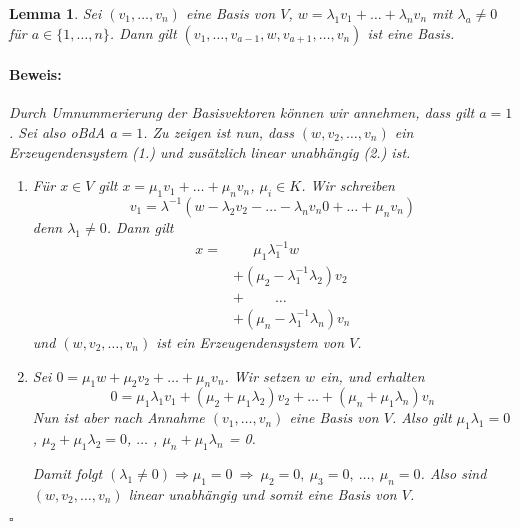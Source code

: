 \documentclass{report}
\newcommand{\lb}{\lambda}
\theoremstyle{customrem}
\theoremstyle{customdef}
\newtheorem{lem}[definition]{Lemma}
\renewenvironment{proof}{\vspace{-.75cm}\paragraph{Beweis: }}{\vspace{-.5cm}\hfill$\square$}
\begin{document}
	\begin{lem}
		\label{lem214}
		Sei $(v_1, \dots, v_n)$ eine Basis von $V$, $w = \lb_1v_1 + \dots +  \lb_n v_n$ mit $\lb_a \neq 0$ für $a \in \{1, \dots, n\}$. Dann gilt $(v_1, \dots, v_{a - 1}, w, v_{a+1}, \dots, v_n)$ ist eine Basis.\\
		
		\begin{proof}
			Durch Umnummerierung der Basisvektoren können wir annehmen, dass gilt $a = 1$. Sei also oBdA $a = 1$. Zu zeigen ist nun, dass $(w, v_2, \dots, v_n)$ ein Erzeugendensystem (1.) und zusätzlich linear unabhängig (2.) ist.
			\begin{enumerate}
				\item Für $x \in V$ gilt $x = \mu_1 v_1 + \ldots + \mu_n v_n$, $\mu_i \in K$. Wir schreiben
					$$v_1 = \lb^{-1}(w-\lb_2 v_2 - \ldots - \lb_n v_n0 + \ldots + \mu_n v_n)$$ denn $\lb_1\not=0$. Dann gilt
					\begin{align*}
						x =&\quad \ \ \mu_1\lb_1^{-1}w\\
						   &+(\mu_2-\lb_1^{-1}\lb_2)v_2\\
						   &+\qquad\ \ldots\\
						   &+(\mu_n-\lb_1^{-1}\lb_n)v_n
					\end{align*}
					und $(w, v_2, \dots, v_n)$ ist ein Erzeugendensystem von $V$.
				\item Sei $0 = \mu_1 w + \mu_2 v_2 + \ldots + \mu_n v_n$. Wir setzen $w$ ein, und erhalten
					$$0 = \mu_1 \lb_1 v_1 + (\mu_2  + \mu_1 \lb_2) v_2 + \ldots + (\mu_n + \mu_1 \lb_n)v_n$$
					Nun ist aber nach Annahme $(v_1, \ldots, v_n)$ eine Basis von $V$. Also gilt $\mu_1\lb_1 = 0$, $\mu_2  + \mu_1 \lb_2=0$, $\ldots$ , $\mu_n + \mu_1 \lb_n$ = 0. 
					
					Damit folgt $(\lb_1 \neq 0) \Rightarrow \mu_1 = 0\ \Rightarrow \ \mu_2=0,\ \mu_3=0,\ \ldots ,\ \mu_n=0$. Also sind $(w, v_2, \dots, v_n)$ linear unabhängig und somit eine Basis von $V$.
			\end{enumerate}
		\end{proof}	
	\end{lem}
	
\end{document}
